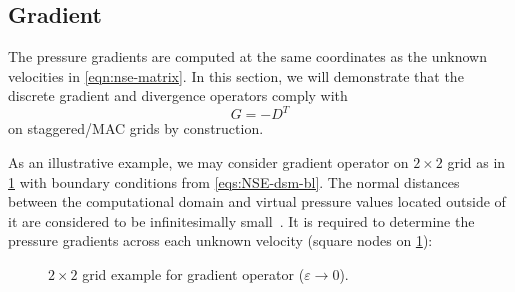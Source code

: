 \documentclass{article}
\numberwithin{equation}{section}
\begin{document}
\subsection{Gradient}\label{subsec:gradient} 

The pressure gradients are computed at the same coordinates as the unknown velocities in \cref{eqn:nse-matrix}. In this section, we will demonstrate that the discrete gradient and divergence operators comply with
\begin{equation}\label{eqn:g-dt}
  {G}=-{D^T}
\end{equation}
on staggered/MAC grids by construction. 

As an illustrative example, we may consider gradient operator on $2\times 2$ grid as in \cref{fig:G-example-2x2} with boundary conditions from \cref{eqs:NSE-dsm-bl}. The normal distances between the computational domain and virtual pressure values located outside of it are considered to be infinitesimally small~\cite{Chang:2002}.  It is required to determine the pressure gradients across each unknown velocity (square nodes on \cref{fig:G-example-2x2}):

\begin{figure}[H] %
  \caption{$2\times 2$ grid example for gradient operator ($\varepsilon\to 0$).}\label{fig:G-example-2x2}
\end{figure}
\end{document}
